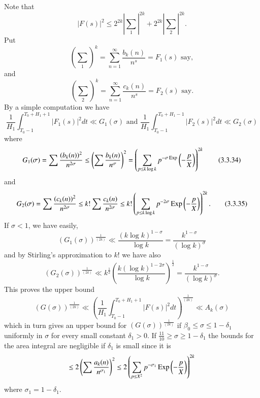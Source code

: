 Note that
\begin{equation*}
|F(s)|^2 \leq 2^{2k} |\sum\limits_1|^{2k} + 2^{2k} |\sum\limits_2|^{2k}.  
\tag{3.3.30}\label{c3:eq3.3.30}
\end{equation*}
Put 
\begin{equation*}
\left(\sum\limits_1 \right)^k = \sum\limits^\infty_{n=1} \frac{b_k(n)}{n^s} = F_1(s) \text{ say}, \tag{3.3.31}\label{c3:eq3.3.31}
\end{equation*}
and 
\begin{equation*}
\left(\sum\limits_2 \right)^k = \sum\limits^\infty_{n=1} \frac{c_k(n)}{n^s} = F_2 (s) \text{ say}. \tag{3.3.32}\label{c3:eq3.3.32}
\end{equation*}
By a simple computation we have 
{\fontsize{10}{12}\selectfont
\begin{equation*}
\frac{1}{H_1} \int^{T_0 + H_1 + 1}_{T_0 -1} |F_1 (s)|^2 dt \ll G_1 (\sigma) \text{ and } \frac{1}{H_1}\int^{T_0 + H_1 -1}_{T_0-1} |F_2(s)|^2 dt \ll G_2(\sigma) \tag{3.3.33}\label{c3:eq3.3.33}
\end{equation*}}
where\pageoriginale
\begin{equation*}
G_1(\sigma)  = \sum  \frac{(b_k (n))^2}{n^{2\sigma}} \leq \left( \sum \frac{b_k(n)}{n^\sigma}\right)^2 = \left(\sum\limits_{p \leq k \log k} p^{-\sigma \operatorname{Exp}} \left( -\frac{p}{X} \right) \right)^{2k} \tag{3.3.34}\label{c3:eq3.3.34}
\end{equation*}
and 
\begin{equation*}
G_2 (\sigma) = \sum \frac{(c_k(n))^2}{n^{2\sigma}} \leq k! \sum \frac{c_k(n)}{n^{2\sigma}} \leq k! \left( \sum\limits_{p \leq k \log k} p^{-2\sigma} \operatorname{Exp} \left( -\frac{p}{X}\right) \right)^{2k}. 
\tag{3.3.35}\label{c3:eq3.3.35}
\end{equation*}
If $\sigma <1$, we have easily,
\begin{equation*}
(G_1(\sigma))^{\frac{1}{(2k)}} \ll \frac{(k \log k)^{1-\sigma}}{\log k} = \frac{k^{1-\sigma}}{(\log k)^\sigma}  \tag{3.3.36}\label{c3:eq3.3.36}
\end{equation*}
and by Stirling's approximation to $k$! we have also
\begin{equation*}
(G_2 (\sigma))^{\frac{1}{(2k)}}  \ll k^{\frac{1}{2}} \left( \frac{k(\log k)^{1-2\sigma}}{\log k}   \right)^{\frac{1}{2}} = \frac{k^{1-\sigma}}{(\log k)^{\sigma}}. 
\tag{3.3.37}\label{c3:eq3.3.37}
\end{equation*}
This proves the upper bound
\begin{equation*}
(G(\sigma))^{\frac{1}{(2k)}} \ll \left(\frac{1}{H_1} \int^{T_0 + H_1 +1}_{T_0 -1} |F(s)|^2 dt \right)^{\frac{1}{(2k)}} \ll A_k(\sigma)  \tag{3.3.38} \label{c3:eq3.3.38}
\end{equation*}
which in turn gives an upper bound for $(G(\sigma))^{\frac{1}{(2k)}}$ if $\beta_0 \leq \sigma \leq 1-\delta_1$ uniformly in $\sigma$ for every small constant $\delta_1 > 0$. If $\frac{11}{10} \geq \sigma \geq 1 -\delta_1$ the bounds for the area integral are negligible if $\delta_1$ is small since it is
$$
\leq 2 \left(\sum \frac{a_k (n)}{n^{\sigma_1}} \right)^2 \leq 2 \left( \sum\limits_{p\leq X^2} p^{-\sigma_1} \operatorname{Exp} \left(-\frac{p}{X} \right)\right)^{2k}
$$
where $\sigma_1 = 1 - \delta_1$.

